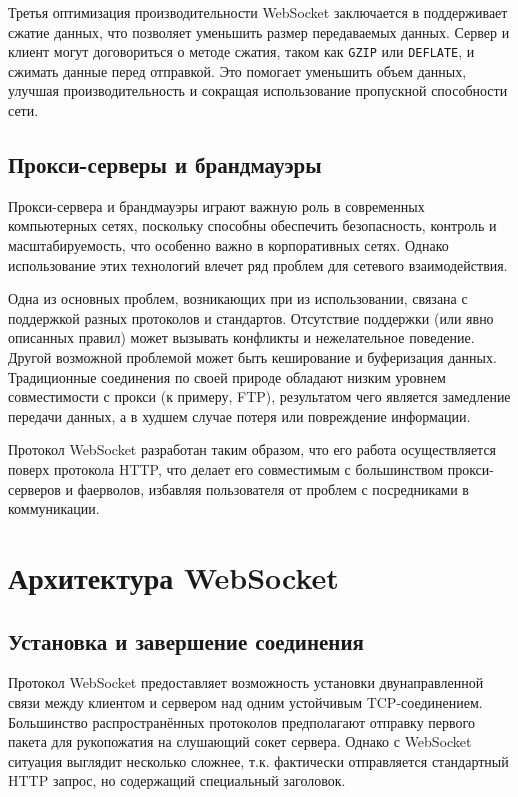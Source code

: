 Третья оптимизация производительности WebSocket заключается в поддерживает сжатие данных, что позволяет уменьшить размер передаваемых данных. Сервер и клиент могут договориться о методе сжатия, таком как \texttt{GZIP} или \texttt{DEFLATE}, и сжимать данные перед отправкой. Это помогает уменьшить объем данных, улучшая производительность и сокращая использование пропускной способности сети.

\subsection{Прокси-серверы и брандмауэры}

Прокси-сервера и брандмауэры играют важную роль в современных компьютерных сетях, поскольку способны обеспечить безопасность, контроль и масштабируемость, что особенно важно в корпоративных сетях. Однако использование этих технологий влечет ряд проблем для сетевого взаимодействия.

Одна из основных проблем, возникающих при из использовании, связана с поддержкой разных протоколов и стандартов. Отсутствие поддержки (или явно описанных правил) может вызывать конфликты и нежелательное поведение. Другой возможной проблемой может быть кеширование и буферизация данных. Традиционные соединения по своей природе обладают низким уровнем совместимости с прокси (к примеру, FTP), результатом чего является замедление передачи данных, а в худшем случае потеря или повреждение информации.

Протокол WebSocket разработан таким образом, что его работа осуществляется поверх протокола HTTP, что делает его совместимым с большинством прокси-серверов и фаерволов, избавляя пользователя от проблем с посредниками в коммуникации.

\section{Архитектура WebSocket}

\subsection{Установка и завершение соединения}

Протокол WebSocket предоставляет возможность установки двунаправленной связи между клиентом и сервером над одним устойчивым TCP-соединением. Большинство распространённых протоколов предполагают отправку первого пакета для рукопожатия на слушающий сокет сервера. Однако с WebSocket ситуация выглядит несколько сложнее, т.к. фактически отправляется стандартный HTTP запрос, но содержащий специальный заголовок.

